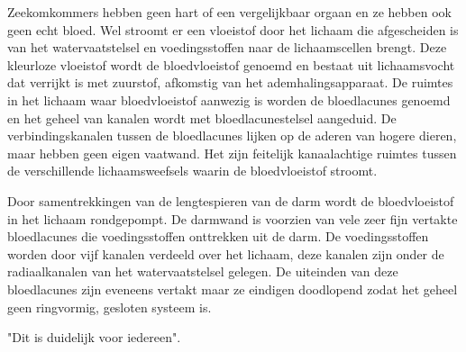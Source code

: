 Zeekomkommers hebben geen hart of een vergelijkbaar orgaan en ze hebben ook geen echt bloed.
Wel stroomt er een vloeistof door het lichaam die afgescheiden is van het watervaatstelsel en voedingsstoffen naar de lichaamscellen brengt.
Deze kleurloze vloeistof wordt de bloedvloeistof genoemd en bestaat uit lichaamsvocht dat verrijkt is met zuurstof, afkomstig van het ademhalingsapparaat.
De ruimtes in het lichaam waar bloedvloeistof aanwezig is worden de bloedlacunes genoemd en het geheel van kanalen wordt met bloedlacunestelsel aangeduid.
De verbindingskanalen tussen de bloedlacunes lijken op de aderen van hogere dieren, maar hebben geen eigen vaatwand.
Het zijn feitelijk kanaalachtige ruimtes tussen de verschillende lichaamsweefsels waarin de bloedvloeistof stroomt.

Door samentrekkingen van de lengtespieren van de darm wordt de bloedvloeistof in het lichaam rondgepompt.
De darmwand is voorzien van vele zeer fijn vertakte bloedlacunes die voedingsstoffen onttrekken uit de darm.
De voedingsstoffen worden door vijf kanalen verdeeld over het lichaam, deze kanalen zijn onder de radiaalkanalen van het watervaatstelsel gelegen.
De uiteinden van deze bloedlacunes zijn eveneens vertakt maar ze eindigen doodlopend zodat het geheel geen ringvormig, gesloten systeem is.

"Dit is duidelijk voor iedereen".
